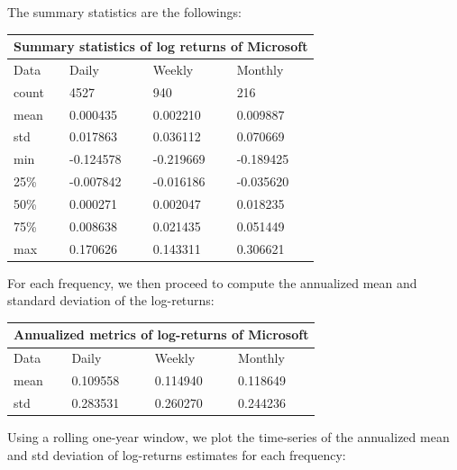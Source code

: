\documentclass[10pt]{article}
\newenvironment{exercise}[2][Exercise]{\begin{trivlist}
  \item[\hskip \labelsep {\bfseries #1}\hskip \labelsep {\bfseries #2.}]}{\end{trivlist}}
\begin{document}
\begin{exercise}{4}
	\smallbreak
	
	The summary statistics are the followings:
	
	\bigbreak	
	
	\begin{tabular}{ |p{3cm}||p{3cm}|p{3cm}|p{3cm}|  }
 		\hline
		\multicolumn{4}{|c|}{Summary statistics of log returns of Microsoft} \\
		\hline
		Data & Daily & Weekly & Monthly\\
 		\hline
 		count   &  4527 & 940 & 216\\
 		mean & 0.000435 & 0.002210 & 0.009887\\
 		std & 0.017863 & 0.036112 & 0.070669\\
 		min & -0.124578 & -0.219669 & -0.189425\\
 		25\% & -0.007842 & -0.016186 & -0.035620\\
 		50\% & 0.000271 & 0.002047 & 0.018235\\
 		75\% & 0.008638 & 0.021435 & 0.051449\\
 		max & 0.170626 & 0.143311 & 0.306621\\
 		\hline
	\end{tabular}
	
	\bigbreak	
	
	For each frequency, we then proceed to compute the annualized mean and standard deviation of the log-returns:
	
	\bigbreak
	
	\begin{tabular}{ |p{3cm}||p{3cm}|p{3cm}|p{3cm}|  }
		\hline
	 	\multicolumn{4}{|c|}{Annualized metrics of log-returns of Microsoft} \\
	 	\hline
	 	Data & Daily & Weekly & Monthly\\
 		\hline
 		mean  &  0.109558 & 0.114940 & 0.118649\\
 		std & 0.283531 & 0.260270 & 0.244236\\
 		\hline
	\end{tabular}
	
	\bigbreak	
	
	Using a rolling one-year window, we plot the time-series of the annualized mean and std deviation of log-returns estimates for each frequency:
	
	\begin{figure}[H]
	

\end{figure}
\end{exercise}
\end{document}
